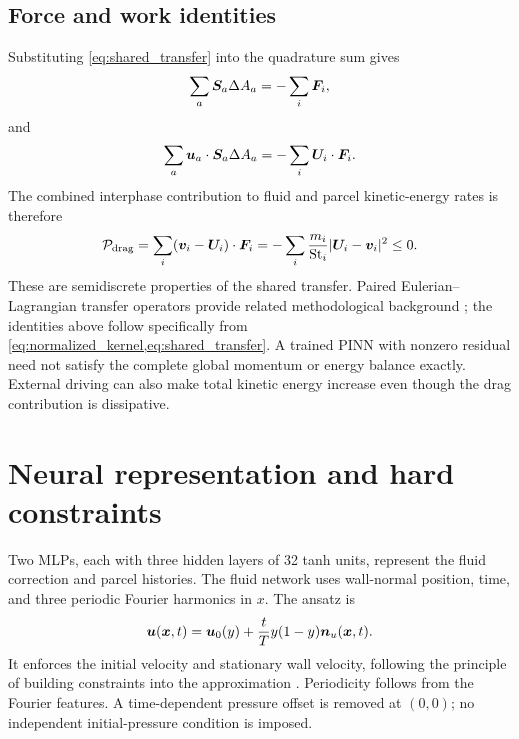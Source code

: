 \subsection{Force and work identities}
Substituting \cref{eq:shared_transfer} into the quadrature sum gives
\begin{equation}
 \sum_a\bm{S}_a\Delta A_a=-\sum_i\bm{F}_i,
 \label{eq:force_identity}
\end{equation}
and
\begin{equation}
 \sum_a\bm{u}_a\cdot\bm{S}_a\Delta A_a
 =-\sum_i\bm{U}_i\cdot\bm{F}_i.
 \label{eq:work_identity}
\end{equation}
The combined interphase contribution to fluid and parcel kinetic-energy
rates is therefore
\begin{equation}
 \mathcal{P}_{\mathrm{drag}}
 =\sum_i(\bm{v}_i-\bm{U}_i)\cdot\bm{F}_i
 =-\sum_i\frac{m_i}{\mathrm{St}_i}|\bm{U}_i-\bm{v}_i|^2\leq0.
 \label{eq:drag_dissipation}
\end{equation}
These are semidiscrete properties of the shared transfer. Paired
Eulerian--Lagrangian transfer operators provide related methodological
background \citep{peskin2002}; the identities above follow specifically
from \cref{eq:normalized_kernel,eq:shared_transfer}. %
 A trained PINN
with nonzero residual need not satisfy the complete global momentum or
energy balance exactly. External driving can also make total kinetic energy
increase even though the drag contribution is dissipative.

\section{Neural representation and hard constraints}
Two MLPs, each with three hidden layers of 32 tanh units, represent the fluid
correction and parcel histories. The fluid network uses wall-normal position,
time, and three periodic Fourier harmonics in $x$. The ansatz is
\begin{equation}
 \bm{u}(\bm{x},t)=\bm{u}_0(y)
 +\frac{t}{T}y(1-y)\bm{n}_{u}(\bm{x},t).
 \label{eq:fluid_ansatz}
\end{equation}
It enforces the initial velocity and stationary wall velocity, following
the principle of building constraints into the approximation
\citep{lagaris1998,sukumar2022}. %
 Periodicity
follows from the Fourier features. A time-dependent pressure offset is
removed at $(0,0)$; no independent initial-pressure condition is imposed.

